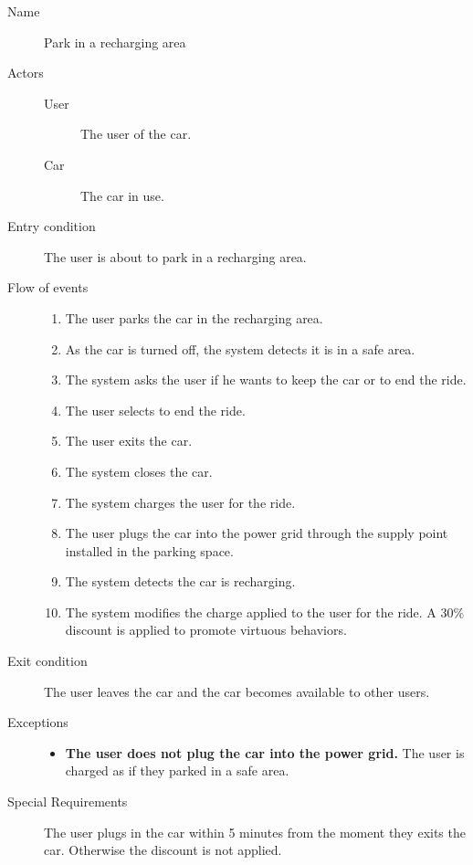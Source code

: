 		\begin{description}
			\item[Name] Park in a recharging area
			\item[Actors] \hfill
			\begin{description}
				\item[User] The user of the car.
				\item[Car] The car in use.
			\end{description}
			\item[Entry condition] The user is about to park in a recharging area.
			\item[Flow of events] \hfill
			\begin{enumerate}
				\item The user parks the car in the recharging area.
				\item As the car is turned off, the system detects it is in a safe area.
				\item The system asks the user if he wants to keep the car or to end the ride.
				\item The user selects to end the ride.
				\item The user exits the car.
				\item The system closes the car.
				\item The system charges the user for the ride.
				\item The user plugs the car into the power grid through the supply point installed in the parking space.
				\item The system detects the car is recharging.
				\item The system modifies the charge applied to the user for the ride. A 30\% discount is applied to promote virtuous behaviors.
			\end{enumerate}
			\item[Exit condition] The user leaves the car and the car becomes available to other users.
			\item[Exceptions] \hfill
			\begin{itemize}
				\item \textbf{The user does not plug the car into the power grid.} The user is charged as if they parked in a safe area.
			\end{itemize}
			\item[Special Requirements] The user plugs in the car within 5 minutes from the moment they exits the car. Otherwise the discount is not applied.
		\end{description}	
		
